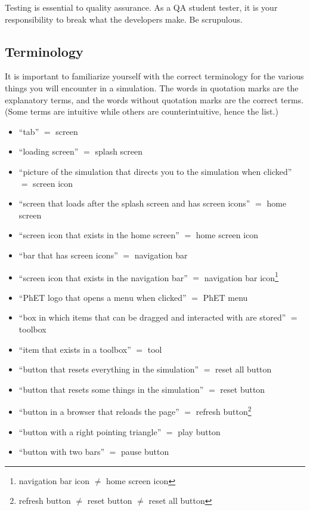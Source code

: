 \documentclass[titlepage]{article}
\begin{document}
Testing is essential to quality assurance. As a QA student tester, it is your responsibility to break what the developers make. Be scrupulous.
	
	\subsection{Terminology}

It is important to familiarize yourself with the correct terminology for the various things you will encounter in a simulation. The words in quotation marks are the explanatory terms, and the words without quotation marks are the correct terms. (Some terms are intuitive while others are counterintuitive, hence the list.)

		\begin{itemize}
			\item ``tab'' $ = $ screen
			\item ``loading screen'' $ = $ splash screen
			\item ``picture of the simulation that directs you to the simulation when clicked'' $ = $ screen icon
			\item ``screen that loads after the splash screen and has screen icons'' $ = $ home screen
			\item ``screen icon that exists in the home screen'' $ = $ home screen icon
			\item ``bar that has screen icons'' $ = $ navigation bar
			\item ``screen icon that exists in the navigation bar'' $ = $ navigation bar icon\footnote{navigation bar icon $ \neq $ home screen icon}
			\item ``PhET logo that opens a menu when clicked'' $ = $ PhET menu
			\item ``box in which items that can be dragged and interacted with are stored'' $ = $ toolbox
			\item ``item that exists in a toolbox'' $ = $ tool
			\item ``button that resets everything in the simulation'' $ = $ reset all button
			\item ``button that resets some things in the simulation'' $ = $ reset button
			\item ``button in a browser that reloads the page'' $ = $ refresh button\footnote{refresh button $ \neq $ reset button $ \neq $ reset all button}
			\item ``button with a right pointing triangle'' $ = $ play button
			\item ``button with two bars'' $ = $ pause button

\end{itemize}
\end{document}
